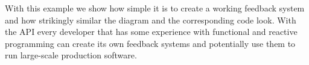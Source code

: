 With this example we show how simple it is to create a working feedback system and how strikingly similar the diagram and the corresponding code look. With the API every developer that has some experience with functional and reactive programming can create its own feedback systems and potentially use them to run large-scale production software.
